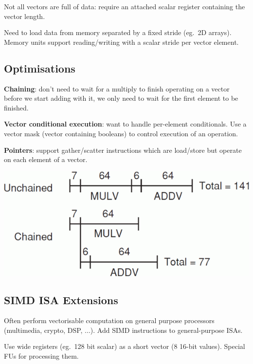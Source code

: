 \documentclass[a4paper,11pt]{article}
\begin{document}
{{        Not all vectors are full of data: require an attached scalar register containing the vector length.

        Need to load data from memory separated by a fixed stride (eg.\ 2D arrays). Memory units support reading/writing with a scalar stride per vector element.
    }
    \subsection*{Optimisations}
    {
        \begin{minipage}[t]{0.6\textwidth}
        \textbf{Chaining}: don't need to wait for a multiply to finish operating on a vector before we start adding with it, we only need to wait for the first element to be finished.

        \textbf{Vector conditional execution}: want to handle per-element conditionals. Use a vector mask (vector containing booleans) to control execution of an operation.

        \textbf{Pointers}: support gather/scatter instructions which are load/store but operate on each element of a vector.
        \end{minipage}
        \hspace{5mm}
        \begin{minipage}[t]{0.35\textwidth}
        \vspace{0pt}
        \centering
        \includegraphics[width=\textwidth]{vector-chaining.png}
        \end{minipage}
    }
    \subsection*{SIMD ISA Extensions}
    {
        Often perform vectorisable computation on general purpose processors (multimedia, crypto, DSP, ...). Add SIMD instructions to general-purpose ISAs.

        Use wide registers (eg.\ 128 bit scalar) as a short vector (8 16-bit values). Special FUs for processing them.
    }
}
\end{document}
